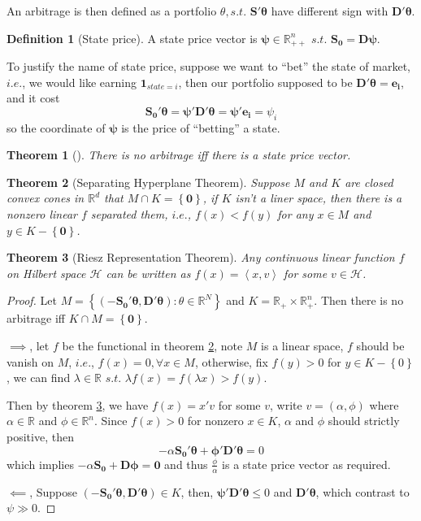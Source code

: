 \documentclass[
  12pt,
  oneside]{book}
\newcommand{\bm}[1]{\symbf{#1}}
\newtheorem{theorem}{Theorem}[chapter]
\theoremstyle{definition}
\newtheorem{definition}{Definition}[chapter]
\theoremstyle{definition}
\theoremstyle{definition}
\theoremstyle{definition}
\theoremstyle{remark}
\begin{document}
An arbitrage is then defined as a portfolio \(\theta, s.t.\) \(\bm{S'\theta}\) have different sign with \(\bm{D'\theta}\).

\begin{definition}[State price]
A state price vector is \(\bm{\psi} \in \mathbb{R}_{++}^{n}\) \(s.t.\) \(\bm{S_0}=\bm{D\psi}\).
\end{definition}

To justify the name of state price, suppose we want to ``bet'' the state of market, \(i.e.\), we would like earning \(\bm{1}_{state=i}\), then our portfolio supposed to be \(\bm{D'\theta}=\bm{e_i}\), and it cost
\[
\bm{S_0'\theta}=\bm{\psi'D'\theta=\psi'e_i=}\psi_i
\]
so the coordinate of \(\bm{\psi}\) is the price of ``betting'' a state.

\begin{theorem}[]
There is no arbitrage iff there is a state price vector.
\end{theorem}

\begin{theorem}[Separating Hyperplane Theorem]
\protect\hypertarget{thm:SPH}{}\label{thm:SPH}Suppose \(M\) and \(K\) are closed convex cones in \(\mathbb{R}^{d}\) that \(M \cap K=\left\{ \bm{0} \right\}\), if \(K\) isn't a liner space, then there is a nonzero linear \(f\) separated them, \(i.e.\), \(f(x)<f(y)\) for any \(x\in M\) and \(y \in K- \left\{ \bm{0} \right\}\).
\end{theorem}

\begin{theorem}[Riesz Representation Theorem]
\protect\hypertarget{thm:riesz}{}\label{thm:riesz}Any continuous linear function \(f\) on Hilbert space \(\mathcal{H}\) can be written as \(f(x)=\left\langle x,v \right\rangle\) for some \(v \in \mathcal{H}\).
\end{theorem}

\begin{proof}
Let \(M=\left\{ (-\bm{S_0'\theta},\bm{D'\theta}):\theta \in \mathbb{R}^{N} \right\}\) and \(K=\mathbb{R}_{+}\times \mathbb{R}_{+}^{n}\). Then there is no arbitrage iff \(K\cap M=\left\{ \bm{0} \right\}\).

\(\implies\), let \(f\) be the functional in theorem \ref{thm:SPH}, note \(M\) is a linear space, \(f\) should be vanish on \(M\), \(i.e.\), \(f(x)=0,\forall x \in M\), otherwise, fix \(f(y)>0\) for \(y\in K-\left\{ 0 \right\}\), we can find \(\lambda \in \mathbb{R}\) \(s.t.\) \(\lambda f(x)=f(\lambda x)>f(y)\).

Then by theorem \ref{thm:riesz}, we have \(f(x)=x'v\) for some \(v\), write \(v=(\alpha,\phi)\) where \(\alpha\in \mathbb{R}\) and \(\phi \in \mathbb{R}^{n}\). Since \(f(x)>0\) for nonzero \(x \in K\), \(\alpha\) and \(\phi\) should strictly positive, then
\[
- \alpha \bm{S_0'\theta}+\bm{\phi'D'\theta}=0
\]
which implies \(-\alpha \bm{S_0}+\bm{D\phi}=\bm{0}\) and thus \(\frac{\phi}{\alpha}\) is a state price vector as required.

\(\impliedby\), Suppose \((-\bm{S_0'\theta},\bm{D'\theta}) \in K\), then, \(\bm{\psi'D'\theta}\le 0\) and \(\bm{D'\theta}\), which contrast to \(\psi \gg 0\).
\end{proof}
\end{document}
